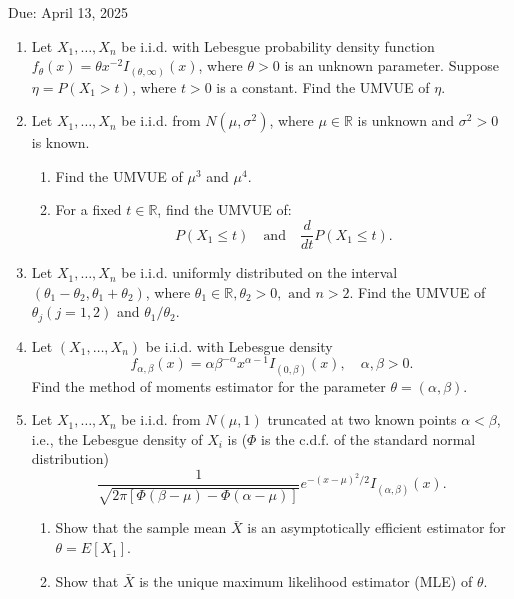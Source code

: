 Due: April 13, 2025

\begin{enumerate}
    \item Let \(X_1, \ldots, X_n\) be i.i.d. with Lebesgue probability density function \(f_\theta(x) = \theta x^{-2} I_{(\theta, \infty)}(x)\), where \(\theta > 0\) is an unknown parameter. Suppose \(\eta = P(X_1 > t)\), where \(t > 0\) is a constant. Find the UMVUE of \(\eta\).

    \item Let \(X_1, \ldots, X_n\) be i.i.d. from \(N(\mu, \sigma^2)\), where \(\mu \in \mathbb{R}\) is unknown and \(\sigma^2 > 0\) is known.
    \begin{enumerate}
        \item Find the UMVUE of \(\mu^3\) and \(\mu^4\).
        \item For a fixed \(t \in \mathbb{R}\), find the UMVUE of:
        \[
        P(X_1 \leq t) \quad \text{and} \quad \frac{d}{dt} P(X_1 \leq t).
        \]
    \end{enumerate}

    \item Let \(X_1, \ldots, X_n\) be i.i.d. uniformly distributed on the interval \((\theta_1 - \theta_2, \theta_1 + \theta_2)\), where \(\theta_1 \in \mathbb{R}, \theta_2 > 0, \text{ and } n > 2\). Find the UMVUE of \(\theta_j (j = 1, 2)\) and \(\theta_1 / \theta_2\).

    \item Let \((X_1, \ldots, X_n)\) be i.i.d. with Lebesgue density
    \[
    f_{\alpha, \beta}(x) = \alpha \beta^{-\alpha} x^{\alpha-1} I_{(0, \beta)}(x), \quad \alpha, \beta > 0.
    \]
    Find the method of moments estimator for the parameter \(\theta = (\alpha, \beta)\).

    \item Let \(X_1, \ldots, X_n\) be i.i.d. from \(N(\mu, 1)\) truncated at two known points \(\alpha < \beta\), i.e., the Lebesgue density of \(X_i\) is (\(\Phi\) is the c.d.f. of the standard normal distribution)
    \[
    \frac{1}{\sqrt{2\pi [\Phi(\beta - \mu) - \Phi(\alpha - \mu)]}} e^{-(x - \mu)^2/2} I_{(\alpha, \beta)}(x).
    \]
    \begin{enumerate}
        \item Show that the sample mean \(\bar{X}\) is an asymptotically efficient estimator for \(\theta = E[X_1]\).
        \item Show that \(\bar{X}\) is the unique maximum likelihood estimator (MLE) of \(\theta\).
    \end{enumerate}


\end{enumerate}
